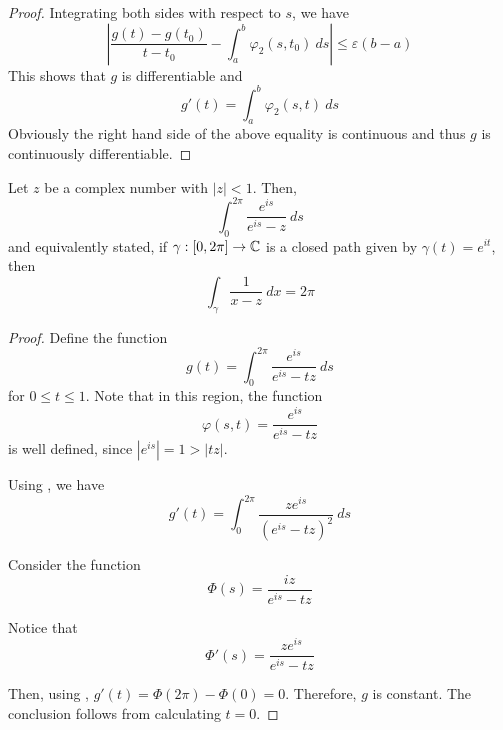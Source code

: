 \begin{proof}
    Integrating both sides with respect to $s$, we have 
    \begin{equation*}
        \left|\frac{g(t) - g(t_0)}{t - t_0} - \int_a^b\varphi_2(s,t_0)~ds\right|\le\varepsilon(b - a)
    \end{equation*}
    This shows that $g$ is differentiable and 
    \begin{equation*}
        g'(t) = \int_a^b\varphi_2(s,t)~ds
    \end{equation*}
    Obviously the right hand side of the above equality is continuous and thus $g$ is continuously differentiable.
\end{proof}

\begin{example}
    Let $z$ be a complex number with $|z| < 1$. Then, 
    \begin{equation*}
        \int_0^{2\pi}\frac{e^{is}}{e^{is} - z}~ds
    \end{equation*}
    and equivalently stated, if $\gamma:[0,2\pi]\to\mathbb{C}$ is a closed path given by $\gamma(t) = e^{it}$, then 
    \begin{equation*}
        \int_\gamma\frac{1}{x - z}~dx = 2\pi
    \end{equation*}
\end{example}
\begin{proof}
    Define the function 
    \begin{equation*}
        g(t) = \int_{0}^{2\pi}\frac{e^{is}}{e^{is} - tz}~ds
    \end{equation*}
    for $0\le t\le 1$. Note that in this region, the function 
    \begin{equation*}
        \varphi(s,t) = \frac{e^{is}}{e^{is} - tz}
    \end{equation*}
    is well defined, since $|e^{is}| = 1 > |tz|$.

    Using , we have 
    \begin{equation*}
        g'(t) = \int_0^{2\pi}\frac{ze^{is}}{\left(e^{is} - tz\right)^2}~ds
    \end{equation*}

    Consider the function 
    \begin{equation*}
        \Phi(s) = \frac{iz}{e^{is} - tz}
    \end{equation*}

    Notice that 
    \begin{equation*}
        \Phi'(s) = \frac{ze^{is}}{e^{is} - tz}
    \end{equation*}

    Then, using , $g'(t) = \Phi(2\pi) - \Phi(0) = 0$. Therefore, $g$ is constant. The conclusion follows from calculating $t = 0$.
\end{proof}

